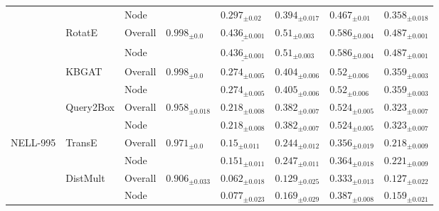 \begin{table}[ht!]
\begin{adjustbox}{width=\textwidth}
\begin{tabular}{llllllll}
         &           & Node &                          &             ${{0.297}_{\pm 0.02}}$ &            ${{0.394}_{\pm 0.017}}$ &             ${{0.467}_{\pm 0.01}}$ &            ${{0.358}_{\pm 0.018}}$ \\
         & RotatE & Overall &    ${{0.998}_{\pm 0.0}}$ &  $\underline{{0.436}_{\pm 0.001}}$ &      $\mathbf{{0.51}_{\pm 0.003}}$ &     $\mathbf{{0.586}_{\pm 0.004}}$ &     $\mathbf{{0.487}_{\pm 0.001}}$ \\
         &           & Node &                          &  $\underline{{0.436}_{\pm 0.001}}$ &      $\mathbf{{0.51}_{\pm 0.003}}$ &     $\mathbf{{0.586}_{\pm 0.004}}$ &     $\mathbf{{0.487}_{\pm 0.001}}$ \\
         & KBGAT & Overall &    ${{0.998}_{\pm 0.0}}$ &            ${{0.274}_{\pm 0.005}}$ &            ${{0.404}_{\pm 0.006}}$ &             ${{0.52}_{\pm 0.006}}$ &            ${{0.359}_{\pm 0.003}}$ \\
         &           & Node &                          &            ${{0.274}_{\pm 0.005}}$ &            ${{0.405}_{\pm 0.006}}$ &             ${{0.52}_{\pm 0.006}}$ &            ${{0.359}_{\pm 0.003}}$ \\
         & Query2Box & Overall &  ${{0.958}_{\pm 0.018}}$ &     $\mathbf{{0.218}_{\pm 0.008}}$ &     $\mathbf{{0.382}_{\pm 0.007}}$ &     $\mathbf{{0.524}_{\pm 0.005}}$ &     $\mathbf{{0.323}_{\pm 0.007}}$ \\
         &           & Node &                          &     $\mathbf{{0.218}_{\pm 0.008}}$ &     $\mathbf{{0.382}_{\pm 0.007}}$ &     $\mathbf{{0.524}_{\pm 0.005}}$ &     $\mathbf{{0.323}_{\pm 0.007}}$ \\
\midrule
NELL-995 & TransE & Overall &    ${{0.971}_{\pm 0.0}}$ &             ${{0.15}_{\pm 0.011}}$ &            ${{0.244}_{\pm 0.012}}$ &            ${{0.356}_{\pm 0.019}}$ &            ${{0.218}_{\pm 0.009}}$ \\
         &           & Node &                          &            ${{0.151}_{\pm 0.011}}$ &            ${{0.247}_{\pm 0.011}}$ &            ${{0.364}_{\pm 0.018}}$ &            ${{0.221}_{\pm 0.009}}$ \\
         & DistMult & Overall &  ${{0.906}_{\pm 0.033}}$ &            ${{0.062}_{\pm 0.018}}$ &            ${{0.129}_{\pm 0.025}}$ &            ${{0.333}_{\pm 0.013}}$ &            ${{0.127}_{\pm 0.022}}$ \\
         &           & Node &                          &            ${{0.077}_{\pm 0.023}}$ &            ${{0.169}_{\pm 0.029}}$ &            ${{0.387}_{\pm 0.008}}$ &            ${{0.159}_{\pm 0.021}}$ \\

\end{tabular}
\end{adjustbox}
\end{table}
